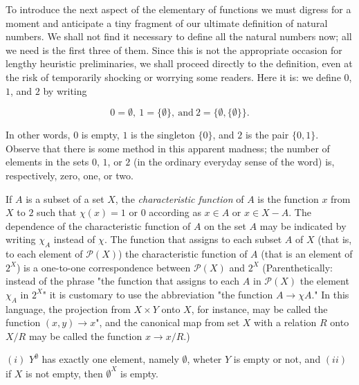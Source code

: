 To introduce the next aspect of the elementary of functions we must digress for a moment and anticipate a tiny fragment of our ultimate definition of natural numbers. We shall not find it necessary to define all the natural numbers now; all we need is the first three of them. Since this is not the appropriate occasion for lengthy heuristic preliminaries, we shall proceed directly to the definition, even at the risk of temporarily shocking or worrying some readers. Here it is: we define  $0$, $1$, and $2$ by writing 

\begin{equation*}
0 = \emptyset , \: 1=\{ \emptyset \} , \: \text{and} \: 2 = \{ \emptyset , \{ \emptyset \} \} . 
\end{equation*}

In other words, $0$ is empty, $1$ is the singleton $\{ 0 \}$, and $2$ is the pair $ \{ 0, 1 \}$. Observe that there is some method in this apparent madness; the number of elements in the sets $0$, $1$, or $2$ (in the ordinary everyday sense of the word) is, respectively, zero, one, or two.

If $A$ is a subset of a set $X$, the \textit{characteristic function} of $A$ is the function $x$ from $X$ to $2$ such that $\chi (x) = 1$ or $0$ according as $x \in A$ or $x \in X - A$. The dependence of the characteristic function of $A$ on the set $A$ may be indicated by writing $\chi_{A}$ instead of $\chi$. The function that assigns to each subset $A$ of $X$ (that is, to each element of $\mathcal{P}(X)$) the characteristic function of $A$ (that is an element of $2^{X}$) is a one-to-one correspondence between $\mathcal{P}(X)$ and $2^{X}$ (Parenthetically: instead of the phrase "the function that assigns to each $A$ in $\mathcal{P}(X)$ the element $\chi_{A}$ in $2^{X}$" it is customary to use the abbreviation "the function $A \rightarrow \chi{A}$." In this language, the projection from $X \times Y$ onto $X$, for instance, may be called the function $(x, y) \rightarrow x$", and the canonical map from set $X$ with a relation $R$ onto $X/R$ may be called the function $x \rightarrow x/R$.) 

\begin{named}[EXERCISE. ]

 $(i)$ $Y^{\emptyset}$ has exactly one element, namely $\emptyset$, wheter $Y$ is empty or not, and $(ii)$ if $X$ is not empty, then $\emptyset^{X}$ is empty.

\end{named}
